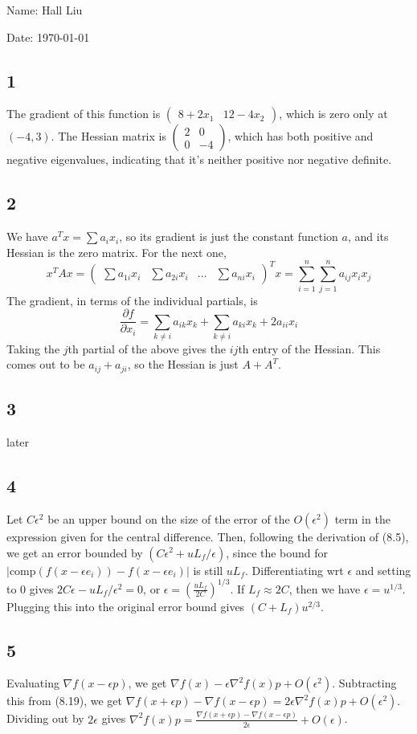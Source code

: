 \documentclass{article}
\newcommand{\dd}{\partial}
\newcommand{\ep}{\epsilon}
\newcommand{\openm}{\begin{pmatrix}}
\newcommand{\closem}{\end{pmatrix}}
\begin{document}
Name: Hall Liu

Date: \today 

\subsection*{1}
The gradient of this function is $\openm 8+2x_1&12-4x_2\closem$, which is zero only at $(-4,3)$. The Hessian matrix is $\openm 2&0\\0&-4\closem$, which has both positive and negative eigenvalues, indicating that it's neither positive nor negative definite.
\vspace{6cm}
\subsection*{2}
We have $a^Tx=\sum a_ix_i$, so its gradient is just the constant function $a$, and its Hessian is the zero matrix. For the next one, 
\[x^TAx=\openm\sum a_{1i}x_i&\sum a_{2i}x_i&\hdots&\sum a_{ni}x_i\closem^Tx=\sum_{i=1}^n\sum_{j=1}^na_{ij}x_ix_j\]
The gradient, in terms of the individual partials, is 
\[\frac{\dd f}{\dd x_i}=\sum_{k\neq i}a_{ik}x_k+\sum_{k\neq i}a_{ki}x_k+2a_{ii}x_i\]
Taking the $j$th partial of the above gives the $ij$th entry of the Hessian. This comes out to be $a_{ij}+a_{ji}$, so the Hessian is just $A+A^T$.
\subsection*{3}
later
\subsection*{4}
Let $C\ep^2$ be an upper bound on the size of the error of the $O(\ep^2)$ term in the expression given for the central difference. Then, following the derivation of (8.5), we get an error bounded by $(C\ep^2+uL_f/\ep)$, since the bound for $|\text{comp}(f(x-\ep e_i))-f(x-\ep e_i)|$ is still $uL_f$. Differentiating wrt $\ep$ and setting to $0$ gives $2C\ep-uL_f/\ep^2=0$, or $\ep=\left(\frac{uL_f}{2C}\right)^{1/3}$. If $L_f\approx 2C$, then we have $\ep=u^{1/3}$. Plugging this into the original error bound gives $(C+L_f)u^{2/3}$.
\subsection*{5}
Evaluating $\nabla f(x-\ep p)$, we get $\nabla f(x)-\ep\nabla^2 f(x)p+O(\ep^2)$. Subtracting this from (8.19), we get $\nabla f(x+\ep p)-\nabla f(x-\ep p)=2\ep\nabla^2 f(x)p+O(\ep^2)$. Dividing out by $2\ep$ gives $\nabla^2 f(x)p=\frac{\nabla f(x+\ep p)-\nabla f(x-\ep p)}{2\ep}+O(\ep)$.
\end{document}
